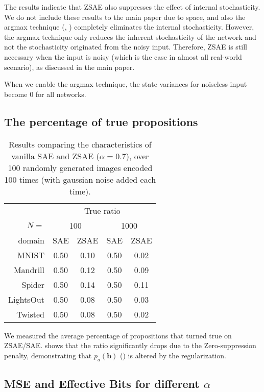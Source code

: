 \documentclass[10pt,letterpaper]{article}
\begin{document}
The results indicate that ZSAE also suppresses the effect of internal stochasticity.
We do not include these results to the main paper due to space,
and also the argmax technique (, )
completely eliminates the internal stochasticity.
However, the argmax technique only reduces the inherent stochasticity of the network
and not the stochasticity originated from the noisy input.
Therefore, ZSAE is still necessary when the input is noisy (which is the case in almost all real-world scenario),
as discussed in the main paper.

When we enable the argmax technique, the state variances for noiseless input become 0 for all networks.

\subsection{The percentage of true propositions}

\begin{table}[htbp]
 \centering
 \setlength{\tabcolsep}{0.45em}
 \begin{tabular}{|r|*{4}{c|}}
       & \multicolumn{4}{c|}{True ratio} \\
$N=$ & \multicolumn{2}{c|}{100} & \multicolumn{2}{c|}{1000} \\
domain    & SAE  & ZSAE & SAE  & ZSAE \\ 
MNIST     & 0.50 & 0.10 & 0.50 & 0.02 \\ 
Mandrill  & 0.50 & 0.12 & 0.50 & 0.09 \\ 
Spider    & 0.50 & 0.14 & 0.50 & 0.11 \\ 
LightsOut & 0.50 & 0.08 & 0.50 & 0.03 \\ 
Twisted   & 0.50 & 0.08 & 0.50 & 0.02 \\ 
\end{tabular}
 \caption{Results comparing the characteristics of vanilla SAE and ZSAE ($\alpha=0.7$),
 over 100 randomly generated images encoded 100 times (with gaussian noise added each time).
 }
\label{tab:trueratio}
\end{table}

We measured the average percentage of propositions that turned true on ZSAE/SAE.
 shows that the ratio significantly drops due to the Zero-suppression penalty,
demonstrating that $p_a(\mathbf{b})$ () is altered by the regularization.

\subsection{MSE and Effective Bits for different $\alpha$}
\label{more-sensitivity}
\end{document}
